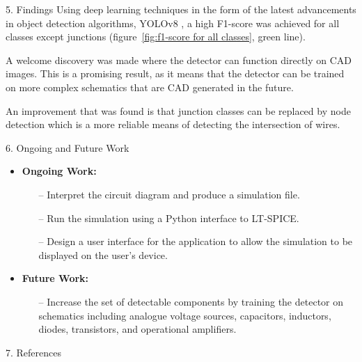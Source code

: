 \documentclass{beamer}
\begin{document}
\begin{frame}[t]
\begin{columns}[t]
\begin{column}{\colwidth}
      \begin{block}{5. Findings}
        Using deep learning techniques in the form of the latest advancements
        in object detection algorithms, YOLOv8 \cite{}, a high F1-score was
        achieved for all classes except junctions (figure~\ref{fig:f1-score for all classes}, green line).

        A welcome discovery was made where the detector can function directly on CAD images.
        This is a promising result, as it means that the detector can be trained on more
        complex schematics that are CAD generated in the future.

        An improvement that was found is that junction classes can be replaced by node detection
        which is a more reliable means of detecting the intersection of wires.
      \end{block}

      \begin{block}{6. Ongoing and Future Work}
        \begin{itemize}
          \item \textbf{Ongoing Work:}
                \begin{itemize}
                  \normalsize
                  \item[--] Interpret the circuit diagram and produce a simulation file.
                  \item[--] Run the simulation using a Python interface to LT-SPICE.
                  \item[--] Design a user interface for the application to allow the
                    simulation to be displayed on the user's device.
                \end{itemize}
          \item \textbf{Future Work:}
                \normalsize
                \begin{itemize}
                  \normalsize
                  \item[--] Increase the set of detectable components by training the
                    detector on schematics including analogue voltage sources, capacitors,
                    inductors, diodes, transistors, and operational amplifiers.
                \end{itemize}
        \end{itemize}
      \end{block}

      \begin{block}{7. References}
        \nocite{*}
        \footnotesize{
          
          
        }
      \end{block}

    \end{column}

    \separatorcolumn

  \end{columns}

  \end{frame}
\end{document}
